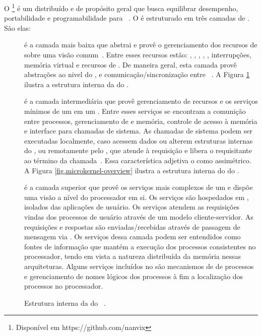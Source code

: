 O \nanvix\footnote{Disponível em https://github.com/nanvix} é um \os distribuído e de propósito geral que busca equilibrar desempenho, portabilidade e programabilidade para \lws~\cite{penna:sbesc19}. O \nanvix é estruturado em três camadas de . São elas:
\begin{description}
    \item [\nanvix \hal]
         é a camada mais baixa que abstrai e provê o gerenciamento dos recursos de \hardware sobre uma visão comum~\cite{penna:hal}. Entre esses recursos estão: \cores, \tlbs, \cache, \mmu, \noc, interrupções, memória virtual e recursos de \io. De maneira geral, esta camada provê abstrações ao nivel do \core, \cluster e comunicação/sincronização entre \clusters~\cite{penna:thesis}. A Figura \ref{fig.hal-overview} ilustra a estrutura interna da \hal do \nanvix.
    \item [\nanvix \Microkernel]
        é a camada intermediária que provê gerenciamento de recursos e os serviços mínimos de um \os em um \cluster. Entre esses serviços se encontram a comunição entre processos, gerenciamento de \threads e memória, controle de acesso à memória e interface para chamadas de sistema. As chamadas de sistema podem ser executadas localmente, caso acessem dados \rdo ou alterem estruturas internas do \core, ou remotamente pelo \mcore, que atende à requisição e libera o \score requisitante ao término da chamada~\cite{penna:thesis}. Essa característica adjetiva o \microkernel como assimétrico. A Figura \ref{fig.microkernel-overview} ilustra a estrutura interna do \microkernel do \nanvix.
    \item [\nanvix \Multikernel]
        é a camada superior que provê os serviços mais complexos de um \os e dispõe uma visão a nível do processador em si. Os serviços são hospedados em \ioclusters, \ie isolados das aplicações de usuário. Os serviços atendem as requisições vindas dos processos de usuário através de um modelo cliente-servidor. As requisições e respostas são enviadas/recebidas através de passagem de mensagem via \noc. Os serviços dessa camada podem ser entendidos como fontes de informação que mantém a execução dos processos consistentes no processador, tendo em vista a natureza distribuída da memória nessas arquiteturas. Alguns serviços incluídos no \nanvix são mecanismos de \spawn de processos e gerenciamento de nomes lógicos dos processos à fim a localização dos processos no processador.
\end{description}

\begin{figure}[t]
    \centering
    
    \caption{Estrutura interna da \hal do \nanvix~\cite{penna:thesis}.}
    \label{fig.hal-overview}
\end{figure}

